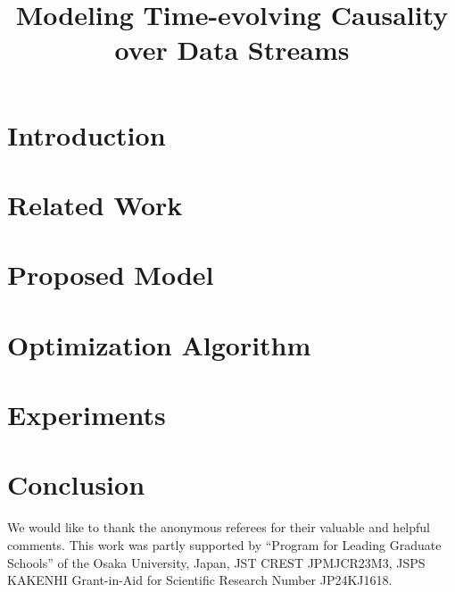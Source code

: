 \documentclass[sigconf]{lib/acmart}
\begin{document}
\title{Modeling Time-evolving Causality over Data Streams}



\maketitle

\section{Introduction}
    \label{section:introduction}
    
\section{Related Work}
    \label{section:related_work}
    
\section{Proposed Model}
    \label{section:model}
    
\section{Optimization Algorithm}
    \label{section:algorithm}
    
\section{Experiments}
    \label{section:experiments}
    
\section{Conclusion}
    \label{section:conclusion}
    

We would like to thank the anonymous referees
for their valuable and helpful comments.
This work was partly supported by
``Program for Leading Graduate Schools'' of the Osaka University, Japan, %
JST CREST JPMJCR23M3,
JSPS KAKENHI Grant-in-Aid for Scientific Research Number
JP24KJ1618.    %

\end{document}
